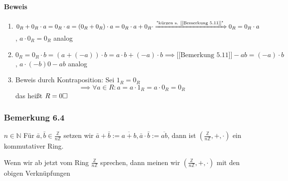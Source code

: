 \documentclass[a4paper]{scrartcl}
\DeclareMathOperator{\Forall}{\forall}
\theoremstyle{definition}
\theoremstyle{plain}
\theoremstyle{plain}
\theoremstyle{remark}
\theoremstyle{remark}
\theoremstyle{remark}
\theoremstyle{remark}
\theoremstyle{remark}
\begin{document}
\paragraph{Beweis}
\label{sec-3-2-3-1}
\begin{enumerate}
\item $0_R + 0_R\cdot a = 0_R\cdot a = (0_R + 0_R)\cdot a = 0_R\cdot a + 0_R\cdot \xRightarrow{\text{"kürzen s. [[Bemerkung 5.11]]"}} 0_R = 0_R \cdot a$, $a\cdot 0_R = 0_R$ analog
\item $0_R = 0_R\cdot b = (a + (-a))\cdot b = a\cdot b + (-a) \cdot b \implies{\text{[[Bemerkung 5.11]]}} - a b = (-a)\cdot b$, $a\cdot(-b) 0 -a b$ analog
\item Beweis durch Kontraposition: Sei $1_R = 0_R$
                \[\implies \Forall a\in R: a = a\cdot 1_R = a\cdot 0_R = 0_R\]
                das heißt $R = 0\hfill\square$
\end{enumerate}
\subsubsection{Bemerkung 6.4}
\label{sec-3-2-4}
$n\in\mathbb{N}$ Für $\bar a, \bar b \in\frac{\mathbb{Z}}{n\mathbb{Z}}$ setzen wir $\bar a + \bar b := \overline{a + b}, \bar a\cdot \bar b := \overline{ab}$, dann ist $(\frac{\mathbb{Z}}{n\mathbb{Z}},+,\cdot)$ ein kommutativer Ring.

Wenn wir ab jetzt vom Ring $\frac{\mathbb{Z}}{n\mathbb{Z}}$ sprechen, dann meinen wir $(\frac{\mathbb{Z}}{n\mathbb{Z}},+,\cdot)$ mit den obigen Verknüpfungen
\end{document}
